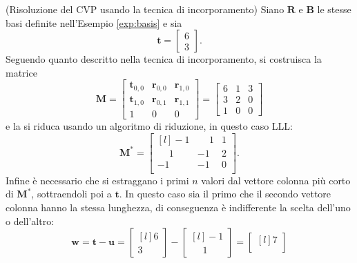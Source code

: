 \begin{exmp}(Risoluzione del CVP usando la tecnica di incorporamento)
Siano $\mathbf{R}$ e $\mathbf{B}$ le stesse basi definite nell'Esempio \ref{exp:basis} e
sia
\[
    \mathbf{t} =
    \begin{bmatrix}
        6\\
        3
    \end{bmatrix}.
\]
Seguendo quanto descritto nella tecnica di incorporamento, si costruisca la matrice 
\[
    \mathbf{M} =
    \begin{bmatrix}
        \mathbf{t}_{0,0} & \mathbf{r}_{0,0} & \mathbf{r}_{1,0}\\
        \mathbf{t}_{1,0} & \mathbf{r}_{0,1} & \mathbf{r}_{1,1}\\
        1 & 0 & 0
    \end{bmatrix}
    =
    \begin{bmatrix}
        6 & 1 & 3 \\
        3 & 2 & 0 \\
        1 & 0 & 0 
    \end{bmatrix}
\]
e la si riduca usando un algoritmo di riduzione, in questo caso LLL:
\begin{equation*}
    \mathbf{M}^* =
    \begin{bmatrix*}[l]
        -1           & \phantom{-}1 & 1\\
        \phantom{-}1 & -1           & 2 \\
        -1           & -1           & 0\\
    \end{bmatrix*}.
\end{equation*}
Infine è necessario che si estraggano i primi $n$ valori dal vettore colonna più corto di 
$\mathbf{M}^*$,
sottraendoli poi a $\mathbf{t}$. In questo caso sia il primo che il secondo vettore colonna hanno
la stessa lunghezza, di conseguenza è indifferente la scelta dell'uno o dell'altro:
\begin{equation*}
    \mathbf{w} = \mathbf{t} - \mathbf{u} =
    \begin{bmatrix*}[l]
        6 \\
        3
    \end{bmatrix*}
    -
    \begin{bmatrix*}[l]
        -1 \\
        \phantom{-}1
    \end{bmatrix*}
    =
    \begin{bmatrix*}[l]
        7 \\

\end{bmatrix*}
\end{equation*}
\end{exmp}
